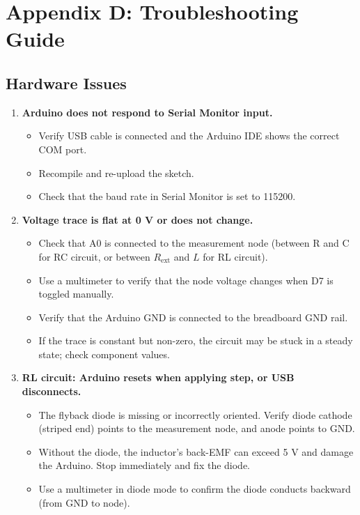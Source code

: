 \documentclass[11pt,letterpaper]{article}
\begin{document}
\section*{Appendix D: Troubleshooting Guide}

\subsection*{Hardware Issues}

\begin{enumerate}
    \item \textbf{Arduino does not respond to Serial Monitor input.}
    \begin{itemize}
        \item Verify USB cable is connected and the Arduino IDE shows the correct COM port.
        \item Recompile and re-upload the sketch.
        \item Check that the baud rate in Serial Monitor is set to 115200.
    \end{itemize}

    \item \textbf{Voltage trace is flat at 0 V or does not change.}
    \begin{itemize}
        \item Check that A0 is connected to the measurement node (between R and C for RC circuit, or between $R_{\text{ext}}$ and $L$ for RL circuit).
        \item Use a multimeter to verify that the node voltage changes when D7 is toggled manually.
        \item Verify that the Arduino GND is connected to the breadboard GND rail.
        \item If the trace is constant but non-zero, the circuit may be stuck in a steady state; check component values.
    \end{itemize}

    \item \textbf{RL circuit: Arduino resets when applying step, or USB disconnects.}
    \begin{itemize}
        \item The flyback diode is missing or incorrectly oriented. Verify diode cathode (striped end) points to the measurement node, and anode points to GND.
        \item Without the diode, the inductor's back-EMF can exceed 5 V and damage the Arduino. Stop immediately and fix the diode.
        \item Use a multimeter in diode mode to confirm the diode conducts backward (from GND to node).
    \end{itemize}


\end{enumerate}
\end{document}
